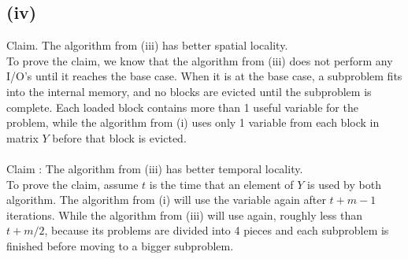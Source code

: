\subsection*{(iv)}

Claim. The algorithm from (iii) has better spatial locality.
\\

To prove the claim, we know that the algorithm from (iii) does not perform any I/O's until
it reaches the base case. When it is at the base case, a subproblem fits into the internal memory,
and no blocks are evicted until the subproblem is complete. Each loaded block contains more than 1 useful
variable for the problem, while the algorithm from (i) uses only 1 variable from each block in matrix $Y$ before
that block is evicted.
\\\\
Claim : The algorithm from (iii) has better temporal locality.
\\

To prove the claim, assume $t$ is the time that an element of $Y$ is used by both algorithm. The algorithm
from (i) will use the variable again after $t + m-1$ iterations. While the algorithm from (iii) will use again,
roughly less than $ t + m/2$, because its problems are divided into 4 pieces and each subproblem is finished
before moving to a bigger subproblem.
